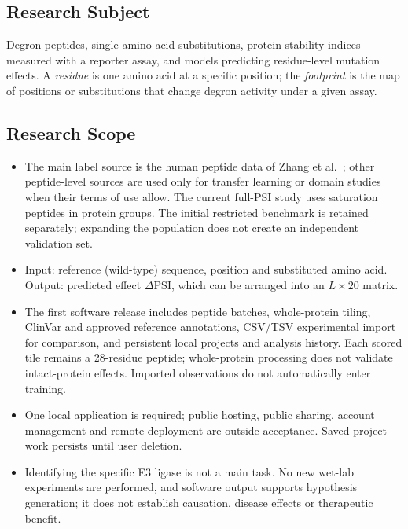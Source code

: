\subsection{Research Subject}
Degron peptides, single amino acid substitutions, protein stability indices measured with a reporter
assay, and models predicting residue-level mutation effects. A \emph{residue} is one amino acid at a
specific position; the \emph{footprint} is the map of positions or substitutions that change degron
activity under a given assay.

\subsection{Research Scope}
\begin{itemize}
  \item The main label source is the human peptide data of Zhang et al.\ \citep{zhang2023}; other peptide-level
        sources are used only for transfer learning or domain studies when their terms of use allow.
        The current full-PSI study uses \nVthreeNPeptides{} saturation peptides in
        \nVthreeNGroups{} protein groups. The initial restricted benchmark is retained separately;
        expanding the population does not create an independent validation set.
  \item Input: reference (wild-type) sequence, position and substituted amino acid. Output: predicted
        effect $\Delta$PSI, which can be arranged into an $L\times 20$ matrix.
  \item The first software release includes peptide batches, whole-protein tiling, ClinVar and approved
        reference annotations, CSV/TSV experimental import for comparison, and persistent local projects
        and analysis history. Each scored tile remains a 28-residue peptide; whole-protein processing
        does not validate intact-protein effects. Imported observations do not automatically enter training.
  \item One local application is required; public hosting, public sharing, account management and
        remote deployment are outside acceptance. Saved project work persists until user deletion.
  \item Identifying the specific E3 ligase is not a main task. No new wet-lab experiments are performed,
        and software output supports hypothesis generation; it does not establish causation, disease
        effects or therapeutic benefit.
\end{itemize}

